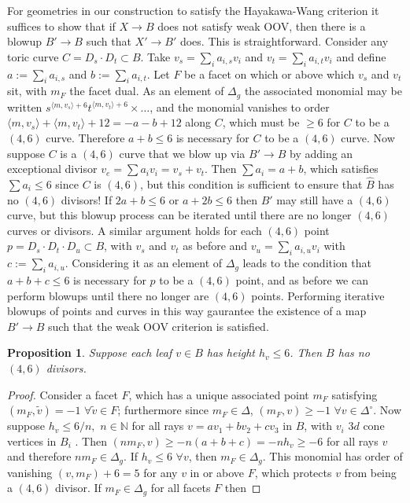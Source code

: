 \documentclass[aps,prl,twocolumn, superscriptaddress,groupedaddress,nofootinbib]{revtex4}
\newtheorem{prop}{Proposition}
\newcommand{\vev}[1]{\langle #1 \rangle}
\begin{document}
For geometries in our construction to satisfy the Hayakawa-Wang criterion it
suffices to show that if $X\to B$ does not satisfy weak OOV, then there is a
blowup $B'\to B$ such that $X'\to B'$ does. This is straightforward.
Consider any toric curve $C=D_s\cdot D_t \subset B$. Take $v_s=\sum_i a_{i,s} v_i$ and $v_t=\sum_i a_{i,t} v_i$ and define $a:=\sum_i a_{i,s}$ and $b:=\sum_i a_{i,t}$. Let $F$ be a facet
on which or above which $v_s$ and $v_t$ sit, with $m_F$ the facet dual. As an
element of $\Delta_g$ the associated monomial may be written
$s^{\vev{m,v_s}+6}t^{\vev{m,v_t}+6}\times \dots$,
and the monomial vanishes to order $\vev{m,v_s}+\vev{m,v_t}+12=-a-b+12$ along $C$,
which must be $\geq 6$ for $C$ to be a $(4,6)$ curve. Therefore $a+b\leq 6$ is necessary for
$C$ to be a $(4,6)$ curve.
Now suppose $C$ is a $(4,6)$ curve that we blow up via $B'\to B$ by
adding an exceptional divisor $v_e = \sum a_i v_i = v_s + v_t$. Then $\sum a_i=a+b$,
which satisfies $\sum a_i\leq 6$ since $C$ is $(4,6)$, but this condition is sufficient to ensure that $\hat B$ has no $(4,6)$ divisors! If $2a+b\leq 6$
or $a+2b\leq 6$ then $B'$ may still have a $(4,6)$ curve, but
this blowup process can be iterated until there are no longer
$(4,6)$ curves or divisors.  A similar argument
holds for each $(4,6)$ point $p=D_s\cdot D_t \cdot D_u \subset  B$, with $v_s$
and $v_t$ as before and $v_u=\sum_i a_{i,u} v_i$ with 
$c:=\sum_i a_{i,u}$. 
Considering
it as an element of $\Delta_g$ leads to the condition that $a+b+c\leq 6$
is necessary for $p$ to be a $(4,6)$ point, and as before we can perform blowups
until there no longer are $(4,6)$ points. Performing iterative blowups of points
and curves in this way gaurantee the existence of a map $B'\to B$ such that the
weak OOV criterion is satisfied.

\begin{prop}
\label{prop:heightcrit}
Suppose each leaf $v\in B$ has height $h_v\leq 6$. Then $B$ has
no $(4,6)$ divisors.
\end{prop}

\begin{proof}
Consider a facet
$F$, which has a unique associated point $m_F$ satisfying
$(m_F,\tilde v)=-1 \,\, \forall \tilde v \in F$; furthermore
since $m_F\in\Delta$, 
$(m_F,v)\geq -1\,\, \forall v\in\Delta^\circ$. Now
suppose $h_v \leq 6/n, \,\, n \in \mathbb{N}$  
for all rays $v=av_1 + b v_2 + c v_3$
in $B$, with $v_i$ $3d$ cone vertices in $B_i$ . Then 
$(nm_F, v)\geq -n(a+b+c)=-nh_v\geq -6$ for all rays $v$ and
therefore $nm_F \in \Delta_g.$ If $h_v\leq 6\,\, \forall v$,
then $m_F\in\Delta_g$. This monomial has order of vanishing
$(v,m_F)+6=5$ for any $v$ in or above $F$, which protects
$v$ from being a $(4,6)$ divisor. If $m_F \in \Delta_g$
for all facets $F$ then
\end{proof}
\end{document}
